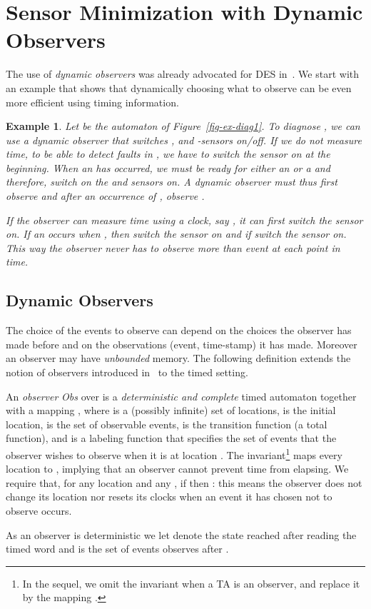\documentclass[letterpaper,10pt,conference]{ieeeconf}  \IEEEoverridecommandlockouts                              \overrideIEEEmargins
\newtheorem{example}{Example}
\def\endef{\ifmmode\squareforged\else{\unskip\nobreak\hfil
\penalty50\hskip1em\null\nobreak\hfil
\parfillskip=0pt\finalhyphendemerits=0\endgraf}\fi}
\def\endex{\ifmmode\squareforged\else{\unskip\nobreak\hfil
\penalty50\hskip1em\null\nobreak\hfil
\parfillskip=0pt\finalhyphendemerits=0\endgraf}\fi}
\def\obs{\textit{Obs}\xspace}
\begin{document}
\section{Sensor Minimization with Dynamic Observers}
\label{sec-dynamic}
The use of \emph{dynamic observers} was already advocated for DES
in~\cite{cassez-acsd-07,cassez-fi-08}.  We start with an example that
shows that dynamically choosing what to observe can be even more
efficient using timing information.

\begin{example}
  Let  be the automaton of Figure~\ref{fig-ex-diag1}.  To
  diagnose , we can use a \emph{dynamic observer} that
  switches ,  and -sensors on/off.  If we do not measure time,
  to be able to detect faults in , we have to switch the 
  sensor on at the beginning. When an  has occurred, we must be
  ready for either an  or a  and therefore, switch on the 
  and  sensors on. A dynamic observer must thus first observe
   and after an occurrence of , observe .

  If the observer can measure time using a clock, say , it can
  first switch the  sensor on. If an  occurs when ,
  then switch the  sensor on and if  switch the  sensor
  on. This way the observer never has to observe more than event at
  each point in time. \endex
\end{example}


\subsection{Dynamic Observers}
The choice of the events to observe can depend on the choices the
observer has made before and on the observations (event, time-stamp) it
has made. Moreover an observer may have \emph{unbounded} memory.  The
following definition extends the notion of observers introduced
in~\cite{cassez-acsd-07} to the timed setting.
 
\begin{definition}[Observer]\label{def-observer2}
  An \emph{observer} \obs over  is a \emph{deterministic and
    complete} timed automaton 
   together with a mapping , where  is a (possibly infinite) set of
  locations,  is the initial location,  is the set
  of observable events,  is the transition function (a total
  function), and  is a labeling function that specifies the set of
  events that the observer wishes to observe when it is at location
  . The invariant\footnote{In the sequel, we omit the invariant
    when a TA is an observer, and replace it by the mapping .}
   maps every location to , implying that an
  observer cannot prevent time from elapsing. We require that, for any
  location  and any , if  then
  : this means the observer does
  not change its location nor resets its clocks when an event it has
  chosen not to observe occurs.  \endef
\end{definition}
As an observer is deterministic we let  
denote the state  reached after reading the timed word  and
 is the set of events  observes after .
\end{document}
